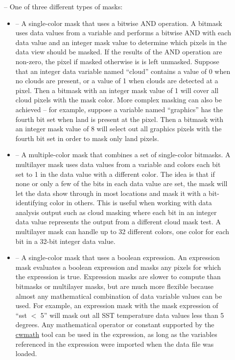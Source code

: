 \begin{description}
\item[] -- One of three different types
of masks:
\begin{itemize}

  \item {} -- A single-color mask that
  uses a bitwise AND operation.  A bitmask uses data values from
  a variable and performs a bitwise AND with each data value and
  an integer mask value to determine which pixels in the data
  view should be masked.  If the results of the AND operation are
  non-zero, the pixel if masked otherwise is is left unmasked.
  Suppose that an integer data variable named ``cloud'' contains
  a value of 0 when no clouds are present, or a value of 1 when
  clouds are detected at a pixel.  Then a bitmask with an integer
  mask value of 1 will cover all cloud pixels with the mask
  color.  More complex masking can also be achieved -- for
  example, suppose a variable named ``graphics'' has the fourth
  bit set when land is present at the pixel.  Then a bitmask with
  an integer mask value of 8 will select out all graphics pixels
  with the fourth bit set in order to mask only land pixels.

  \item {} -- A multiple-color mask that
  combines a set of single-color bitmasks.  A multilayer mask
  uses data values from a variable and colors each bit set to 1
  in the data value with a different color.  The idea is that if
  none or only a few of the bits in each data value are set, the
  mask will let the data show through in most locations and mask
  it with a bit-identifying color in others.  This is useful when
  working with data analysis output such as cloud masking where
  each bit in an integer data value represents the output from a
  different cloud mask test.  A multilayer mask can handle up to
  32 different colors, one color for each bit in a 32-bit integer
  data value.

  \item {} -- A single-color
  mask that uses a boolean expression.  An expression mask
  evaluates a boolean expression and masks any pixels for which
  the expression is true.  Expression masks are slower to compute
  than bitmasks or multilayer masks, but are much more flexible
  because almost any mathematical combination of data variable
  values can be used.  For example, an expression mask with the
  mask expression of ``sst $<$ 5'' will mask out all SST
  temperature data values less than 5 degrees.  Any mathematical
  operator or constant supported by the
  \hyperlink{cwmath}{cwmath} tool can be used in the expression,
  as long as the variables referenced in the expression were
  imported when the data file was loaded.


\end{itemize}
\end{description}
